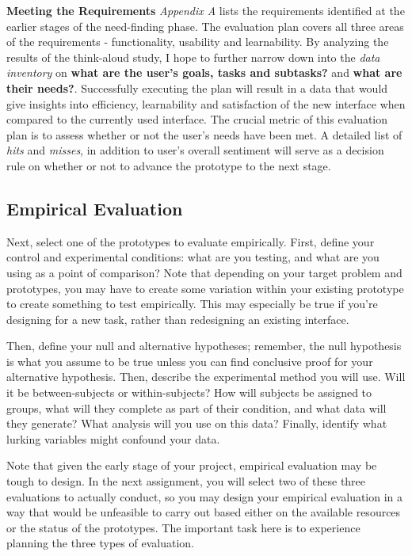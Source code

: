 \documentclass[12pt,letterpaper]{article}
\begin{document}
\textbf{Meeting the Requirements} \textit{Appendix A} lists the requirements identified at the earlier stages of the need-finding phase. The evaluation plan covers all three areas of the requirements - functionality, usability and learnability. By analyzing the results of the think-aloud study, I hope to further narrow down into the \textit{data inventory} on \textbf{what are the user's goals, tasks and subtasks?} and \textbf{what are their needs?}.  Successfully executing the plan will result in a data that would give insights into efficiency, learnability and satisfaction of the new interface when compared to the currently used interface. The crucial metric of this evaluation plan is to assess whether or not the user's needs have been met. A detailed list of \textit{hits} and \textit{misses}, in addition to user's overall sentiment will serve as a decision rule on whether or not to advance the prototype to the next stage. 


\subsection*{Empirical Evaluation}
Next, select one of the prototypes to evaluate empirically. First, define your control and experimental conditions: what are you testing, and what are you using as a point of comparison? Note that depending on your target problem and prototypes, you may have to create some variation within your existing prototype to create something to test empirically. This may especially be true if you’re designing for a new task, rather than redesigning an existing interface.

Then, define your null and alternative hypotheses; remember, the null hypothesis is what you assume to be true unless you can find conclusive proof for your alternative hypothesis. Then, describe the experimental method you will use. Will it be between-subjects or within-subjects? How will subjects be assigned to groups, what will they complete as part of their condition, and what data will they generate? What analysis will you use on this data? Finally, identify what lurking variables might confound your data.

Note that given the early stage of your project, empirical evaluation may be tough to design. In the next assignment, you will select two of these three evaluations to actually conduct, so you may design your empirical evaluation in a way that would be unfeasible to carry out based either on the available resources or the status of the prototypes. The important task here is to experience planning the three types of evaluation.
\end{document}
